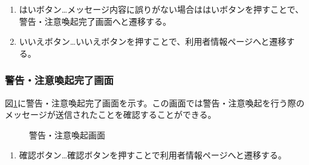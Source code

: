 \documentclass[a4j]{jarticle}
\begin{document}
\begin{enumerate}
  \renewcommand{\labelenumi}{\textcircled{\scriptsize \theenumi}}

\item はいボタン…メッセージ内容に誤りがない場合ははいボタンを押すことで、警告・注意喚起完了画面へと遷移する。
\item いいえボタン…いいえボタンを押すことで、利用者情報ページへと遷移する。

\end{enumerate}

\subsubsection{警告・注意喚起完了画面}
図\ref{fig:warning_ok}に警告・注意喚起完了画面を示す。この画面では警告・注意喚起を行う際のメッセージが送信されたことを確認することができる。
\begin{figure}[H]
\centering
{}
\caption{警告・注意喚起画面}
\label{fig:warning_ok}
\end{figure}

\begin{enumerate}
  \renewcommand{\labelenumi}{\textcircled{\scriptsize \theenumi}}

\item 確認ボタン…確認ボタンを押すことで利用者情報ページへと遷移する。

\end{enumerate}
\end{document}
